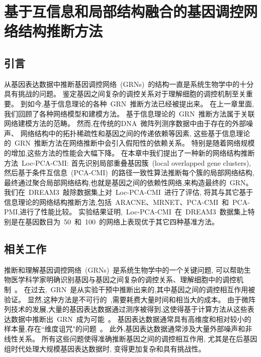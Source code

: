 \section{基于互信息和局部结构融合的基因调控网络结构推断方法}
\label{sec:locpcacmi}

\subsection{引言}

从基因表达数据中推断基因调控网络~(GRNs)~的结构一直是系统生物学中的十分具有挑战的问题。
鉴定基因之间复杂的调控关系对于理解细胞的调控机制至关重要。
到如今,基于信息理论的各种~GRN~推断方法已经被提出来。
在上一章里面, 我们回顾了各种网络模型和建模方法。
基于信息理论的~GRN~推断方法属于关联网络建模方法的范畴。
然而,在传统的DNA~微阵列测序数据中由于存在的外部噪声、
网络结构中的拓扑稀疏性和基因之间的传递依赖等因素,
这些基于信息理论的~GRN~推断方法在网络推断中会引入假阳性的依赖关系。
特别是随着网络规模的增加,这些方法的性能会大幅下降。
在本章中我们提出了一种新的网络结构推断方法~Loc-PCA-CMI:
首先识别局部重叠基因簇~(local overlapped gene clusters),
然后基于条件互信息~(PCA-CMI)~的路径一致性算法推断每个簇的局部网络结构,
最终通过聚合局部网络结构,也就是基因之间的依赖性网络,来构造最终的~GRN。
我们在~DREAM3~敲除数据集上对~Loc-PCA-CMI~进行了评估,
将其与其它基于信息理论的网络结构推断方法,包括~ARACNE、MRNET、PCA-CMI~和~PCA-PMI,进行了性能比较。
实验结果证明,~Loc-PCA-CMI~在~DREAM3~数据集上特别是在基因数目为~50~和~100~的网络上表现优于其它四种基准方法。

\subsection{相关工作}

推断和理解基因调控网络~(GRNs)~是系统生物学中的一个关键问题, 
可以帮助生物医学科学家明确识别基因与基因之间复杂的调控关系、理解细胞中的调控机制~\cite{altay2010inferring, basso2005reverse}。
在过去,~GRN~是从实验干预中推断出来的,其中基因之间的调控相互作用被验证。
显然,这种方法是不可行的~\cite{elnitski2006locating},需要耗费大量时间和相当大的成本。
由于微阵列技术的发展,大量的基因表达数据通过测序被得到,这使得基于计算方法从这些表达数据中推断出~GRN~成为可能~\cite{maetschke2013supervised}。
基因表达数据通常具有高维度和相对较小的样本量,存在``维度诅咒"的问题~\cite{wang2006inferring}。
此外,基因表达数据通常涉及大量外部噪声和非线性关系。
所有这些问题使得准确推断基因之间的调控相互作用,
尤其是在后基因组时代处理大规模基因表达数据时,
变得更加复杂和具有挑战性。


